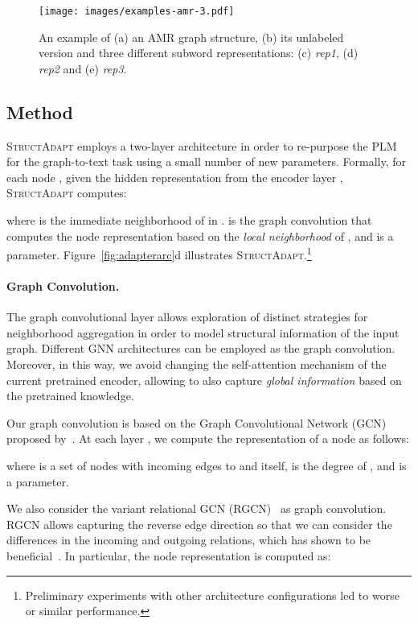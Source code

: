 \documentclass[11pt]{article}
\newcommand{\graphadapter}{{\small\textsc{StructAdapt}}\xspace}
\begin{document}
\begin{figure}[t]
    \centering
    \texttt{[image: images/examples-amr-3.pdf]}
    \caption{An example of (a) an AMR graph structure, (b) its unlabeled version and three different subword representations: (c) \emph{rep1}, (d) \emph{rep2} and (e) \emph{rep3}.}
    \label{fig:amrreps}
\end{figure}



\subsection{Method}
\label{sec:method}

\graphadapter employs a two-layer architecture in order to re-purpose the PLM for the graph-to-text task using a small number of new parameters. Formally, for each node , given the hidden representation  from the encoder layer , \graphadapter computes:

where  is the immediate neighborhood of  in .  is the graph convolution that computes the node representation based on the \emph{local neighborhood} of , and  is a parameter. Figure~\ref{fig:adapterarc}d illustrates \graphadapter.\footnote{Preliminary experiments with other architecture configurations led to worse or similar performance.}

\paragraph{Graph Convolution.} The graph convolutional layer allows exploration of distinct strategies for neighborhood aggregation in order to model structural information of the input graph. Different GNN architectures \cite{velickovic2018graph, xu2018how} can be employed as the graph convolution. Moreover, in this way, we avoid changing the self-attention mechanism of the current pretrained encoder, allowing to also capture \emph{global information} based on the pretrained knowledge.

Our graph convolution is based on the Graph Convolutional Network (GCN) proposed by~\citet{Kipf:2016tc}. At each layer , we compute the representation of a node  as follows:  


where  is a set of nodes with incoming edges to  and  itself,  is the degree of , and  is a parameter. 

We also consider the variant relational GCN (RGCN)~\cite{Schlichtkrull2018ModelingRD} as graph convolution. RGCN allows capturing the reverse edge direction so that we can consider the differences in the incoming and outgoing relations, which has shown to be beneficial~\cite{beck-etal-2018-graph}. In particular, the node representation is computed as:
\end{document}
